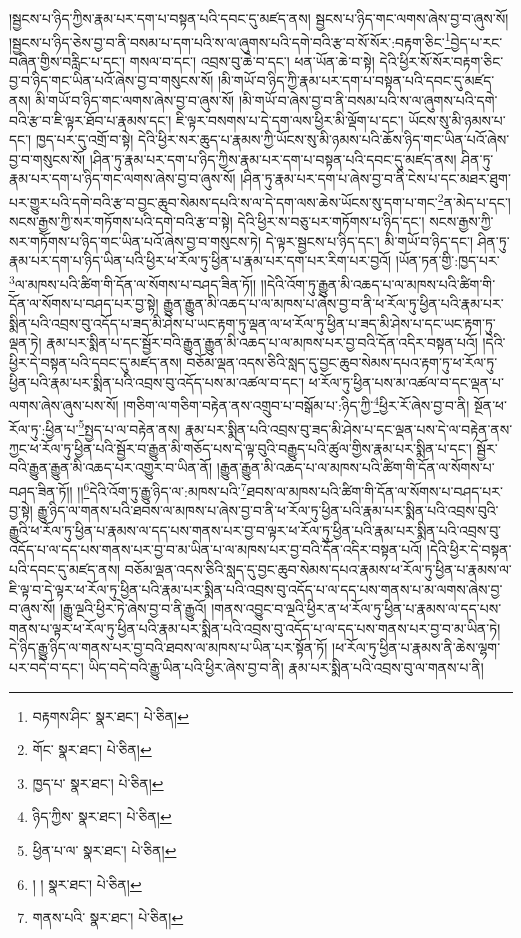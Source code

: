 །སྦྱངས་པ་ཉིད་ཀྱིས་རྣམ་པར་དག་པ་བསྟན་པའི་དབང་དུ་མཛད་ནས། སྦྱངས་པ་ཉིད་གང་ལགས་ཞེས་བྱ་བ་ཞུས་སོ། །སྦྱངས་པ་ཉིད་ཅེས་བྱ་བ་ནི་བསམ་པ་དག་པའི་ས་ལ་ཞུགས་པའི་དགེ་བའི་རྩ་བ་སོ་སོར་:བརྟག་ཅིང་\footnote{བརྟགས་ཤིང་  སྣར་ཐང་།  པེ་ཅིན། }བྱེད་པ་རང་བཞིན་གྱིས་བརླིང་པ་དང་། གསལ་བ་དང་། འབྲས་བུ་ཆེ་བ་དང་། ཕན་ཡོན་ཆེ་བ་སྟེ། དེའི་ཕྱིར་སོ་སོར་བརྟག་ཅིང་བྱ་བ་ཉིད་གང་ཡིན་པའོ་ཞེས་བྱ་བ་གསུངས་སོ། །མི་གཡོ་བ་ཉིད་ཀྱི་རྣམ་པར་དག་པ་བསྟན་པའི་དབང་དུ་མཛད་ནས། མི་གཡོ་བ་ཉིད་གང་ལགས་ཞེས་བྱ་བ་ཞུས་སོ། །མི་གཡོ་བ་ཞེས་བྱ་བ་ནི་བསམ་པའི་ས་ལ་ཞུགས་པའི་དགེ་བའི་རྩ་བ་ཇི་ལྟར་ཐོབ་པ་རྣམས་དང་། ཇི་ལྟར་བསགས་པ་དེ་དག་ལས་ཕྱིར་མི་ལྡོག་པ་དང་། ཡོངས་སུ་མི་ཉམས་པ་དང་། ཁྱད་པར་དུ་འགྲོ་བ་སྟེ། དེའི་ཕྱིར་སར་ཆུད་པ་རྣམས་ཀྱི་ཡོངས་སུ་མི་ཉམས་པའི་ཆོས་ཉིད་གང་ཡིན་པའོ་ཞེས་བྱ་བ་གསུངས་སོ། །ཤིན་ཏུ་རྣམ་པར་དག་པ་ཉིད་ཀྱིས་རྣམ་པར་དག་པ་བསྟན་པའི་དབང་དུ་མཛད་ནས། ཤིན་ཏུ་རྣམ་པར་དག་པ་ཉིད་གང་ལགས་ཞེས་བྱ་བ་ཞུས་སོ། །ཤིན་ཏུ་རྣམ་པར་དག་པ་ཞེས་བྱ་བ་ནི་ངེས་པ་དང་མཐར་ཐུག་པར་གྱུར་པའི་དགེ་བའི་རྩ་བ་བྱང་ཆུབ་སེམས་དཔའི་ས་ལ་དེ་དག་ལས་ཆེས་ཡོངས་སུ་དག་པ་གང་\footnote{གོང་  སྣར་ཐང་།  པེ་ཅིན། }ན་མེད་པ་དང་། སངས་རྒྱས་ཀྱི་སར་གཏོགས་པའི་དགེ་བའི་རྩ་བ་སྟེ། དེའི་ཕྱིར་ས་བཅུ་པར་གཏོགས་པ་ཉིད་དང་། སངས་རྒྱས་ཀྱི་སར་གཏོགས་པ་ཉིད་གང་ཡིན་པའོ་ཞེས་བྱ་བ་གསུངས་ཏེ། དེ་ལྟར་སྦྱངས་པ་ཉིད་དང་། མི་གཡོ་བ་ཉིད་དང་། ཤིན་ཏུ་རྣམ་པར་དག་པ་ཉིད་ཡིན་པའི་ཕྱིར་ཕ་རོལ་ཏུ་ཕྱིན་པ་རྣམ་པར་དག་པར་རིག་པར་བྱའོ། །ཡོན་ཏན་གྱི་:ཁྱད་པར་\footnote{ཁྱད་པ་  སྣར་ཐང་།  པེ་ཅིན། }ལ་མཁས་པའི་ཚིག་གི་དོན་ལ་སོགས་པ་བཤད་ཟིན་ཏོ།། །།དེའི་འོག་ཏུ་རྒྱུན་མི་འཆད་པ་ལ་མཁས་པའི་ཚིག་གི་དོན་ལ་སོགས་པ་བཤད་པར་བྱ་སྟེ། རྒྱུན་རྒྱུན་མི་འཆད་པ་ལ་མཁས་པ་ཞེས་བྱ་བ་ནི་ཕ་རོལ་ཏུ་ཕྱིན་པའི་རྣམ་པར་སྨིན་པའི་འབྲས་བུ་འདོད་པ་ཟད་མི་ཤེས་པ་ཡང་རྟག་ཏུ་ལྡན་ལ་ཕ་རོལ་ཏུ་ཕྱིན་པ་ཟད་མི་ཤེས་པ་དང་ཡང་རྟག་ཏུ་ལྡན་ཏེ། རྣམ་པར་སྨིན་པ་དང་སྦྱོར་བའི་རྒྱུན་རྒྱུན་མི་འཆད་པ་ལ་མཁས་པར་བྱ་བའི་དོན་འདིར་བསྟན་པའོ། །དེའི་ཕྱིར་དེ་བསྟན་པའི་དབང་དུ་མཛད་ནས། བཅོམ་ལྡན་འདས་ཅིའི་སླད་དུ་བྱང་ཆུབ་སེམས་དཔའ་རྟག་ཏུ་ཕ་རོལ་ཏུ་ཕྱིན་པའི་རྣམ་པར་སྨིན་པའི་འབྲས་བུ་འདོད་པས་མ་འཚལ་བ་དང་། ཕ་རོལ་ཏུ་ཕྱིན་པས་མ་འཚལ་བ་དང་ལྡན་པ་ལགས་ཞེས་ཞུས་པས་སོ། །གཅིག་ལ་གཅིག་བརྟེན་ནས་འགྲུབ་པ་བསྒོམ་པ་:ཉིད་ཀྱི་\footnote{ཉིད་ཀྱིས་  སྣར་ཐང་།  པེ་ཅིན། }ཕྱིར་རོ་ཞེས་བྱ་བ་ནི། སྔོན་ཕ་རོལ་ཏུ་:ཕྱིན་པ་\footnote{ཕྱིན་པ་ལ་  སྣར་ཐང་།  པེ་ཅིན། }སྤྱད་པ་ལ་བརྟེན་ནས། རྣམ་པར་སྨིན་པའི་འབྲས་བུ་ཟད་མི་ཤེས་པ་དང་ལྡན་པས་དེ་ལ་བརྟེན་ནས་ཀྱང་ཕ་རོལ་ཏུ་ཕྱིན་པའི་སྦྱོར་བ་རྒྱུན་མི་གཅོད་པས་དེ་ལྟ་བུའི་བརྒྱུད་པའི་ཚུལ་གྱིས་རྣམ་པར་སྨིན་པ་དང་། སྦྱོར་བའི་རྒྱུན་རྒྱུན་མི་འཆད་པར་འགྱུར་བ་ཡིན་ནོ། །རྒྱུན་རྒྱུན་མི་འཆད་པ་ལ་མཁས་པའི་ཚིག་གི་དོན་ལ་སོགས་པ་བཤད་ཟིན་ཏོ།། །།\footnote{། །  སྣར་ཐང་།  པེ་ཅིན། }དེའི་འོག་ཏུ་རྒྱུ་ཉིད་ལ་:མཁས་པའི་\footnote{གནས་པའི་  སྣར་ཐང་།  པེ་ཅིན། }ཐབས་ལ་མཁས་པའི་ཚིག་གི་དོན་ལ་སོགས་པ་བཤད་པར་བྱ་སྟེ། རྒྱུ་ཉིད་ལ་གནས་པའི་ཐབས་ལ་མཁས་པ་ཞེས་བྱ་བ་ནི་ཕ་རོལ་ཏུ་ཕྱིན་པའི་རྣམ་པར་སྨིན་པའི་འབྲས་བུའི་རྒྱུའི་ཕ་རོལ་ཏུ་ཕྱིན་པ་རྣམས་ལ་དད་པས་གནས་པར་བྱ་བ་ལྟར་ཕ་རོལ་ཏུ་ཕྱིན་པའི་རྣམ་པར་སྨིན་པའི་འབྲས་བུ་འདོད་པ་ལ་དད་པས་གནས་པར་བྱ་བ་མ་ཡིན་པ་ལ་མཁས་པར་བྱ་བའི་དོན་འདིར་བསྟན་པའོ། །དེའི་ཕྱིར་དེ་བསྟན་པའི་དབང་དུ་མཛད་ནས། བཅོམ་ལྡན་འདས་ཅིའི་སླད་དུ་བྱང་ཆུབ་སེམས་དཔའ་རྣམས་ཕ་རོལ་ཏུ་ཕྱིན་པ་རྣམས་ལ་ཇི་ལྟ་བ་དེ་ལྟར་ཕ་རོལ་ཏུ་ཕྱིན་པའི་རྣམ་པར་སྨིན་པའི་འབྲས་བུ་འདོད་པ་ལ་དད་པས་གནས་པ་མ་ལགས་ཞེས་བྱ་བ་ཞུས་སོ། །རྒྱུ་ལྔའི་ཕྱིར་ཏེ་ཞེས་བྱ་བ་ནི་རྒྱུའོ། །གནས་འབྱུང་བ་ལྔའི་ཕྱིར་ན་ཕ་རོལ་ཏུ་ཕྱིན་པ་རྣམས་ལ་དད་པས་གནས་པ་ལྟར་ཕ་རོལ་ཏུ་ཕྱིན་པའི་རྣམ་པར་སྨིན་པའི་འབྲས་བུ་འདོད་པ་ལ་དད་པས་གནས་པར་བྱ་བ་མ་ཡིན་ཏེ། དེ་ཉིད་རྒྱུ་ཉིད་ལ་གནས་པར་བྱ་བའི་ཐབས་ལ་མཁས་པ་ཡིན་པར་སྟོན་ཏོ། །ཕ་རོལ་ཏུ་ཕྱིན་པ་རྣམས་ནི་ཆེས་ལྷག་པར་བདེ་བ་དང་། ཡིད་བདེ་བའི་རྒྱུ་ཡིན་པའི་ཕྱིར་ཞེས་བྱ་བ་ནི། རྣམ་པར་སྨིན་པའི་འབྲས་བུ་ལ་གནས་པ་ནི། 